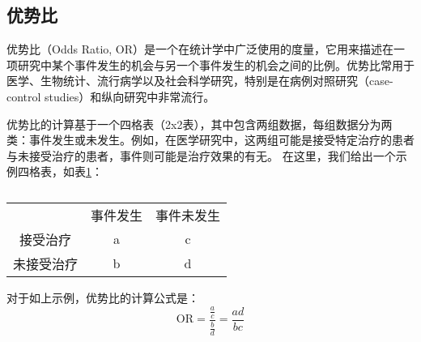 \subsection{优势比}

优势比（Odds Ratio, OR）\cite{bland2000odds, mchugh2009odds}是一个在统计学中广泛使用的度量，它用来描述在一项研究中某个事件发生的机会与另一个事件发生的机会之间的比例。优势比常用于医学、生物统计、流行病学以及社会科学研究，特别是在病例对照研究（case-control studies）和纵向研究中非常流行。

优势比的计算基于一个四格表（2x2表），其中包含两组数据，每组数据分为两类：事件发生或未发生。例如，在医学研究中，这两组可能是接受特定治疗的患者与未接受治疗的患者，事件则可能是治疗效果的有无。
在这里，我们给出一个示例四格表，如表\ref{tab:odds}：

\begin{table}[h]
	\centering
 	\caption{}
	\begin{tabular}{ccc}
		      & 事件发生 & 事件未发生 \\
		接受治疗  & a    & c     \\
		未接受治疗 & b    & d    
	\end{tabular}

	\label{tab:odds}
\end{table}

对于如上示例，优势比的计算公式是：
\[
\text{OR} = \frac{\frac{a}{c}}{\frac{b}{d}} = \frac{ad}{bc}
\]

